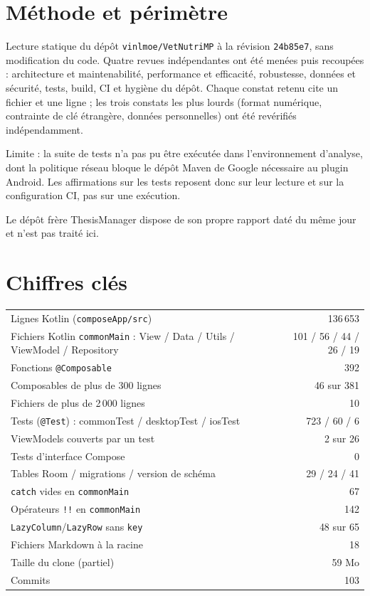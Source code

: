 \documentclass[11pt,a4paper]{article}
\newcommand{\fichier}[1]{\texttt{\small #1}}
\newcommand{\code}[1]{\texttt{#1}}
\begin{document}
\section{Méthode et périmètre}

Lecture statique du dépôt \code{vinlmoe/VetNutriMP} à la révision \code{24b85e7}, sans
modification du code. Quatre revues indépendantes ont été menées puis recoupées : architecture et
maintenabilité, performance et efficacité, robustesse, données et sécurité, tests, build, CI et
hygiène du dépôt. Chaque constat retenu cite un fichier et une ligne ; les trois constats les plus
lourds (format numérique, contrainte de clé étrangère, données personnelles) ont été revérifiés
indépendamment.

Limite : la suite de tests n'a pas pu être exécutée dans l'environnement d'analyse, dont la
politique réseau bloque le dépôt Maven de Google nécessaire au plugin Android. Les affirmations
sur les tests reposent donc sur leur lecture et sur la configuration CI, pas sur une exécution.

Le dépôt frère ThesisManager dispose de son propre rapport daté du même jour et n'est pas traité
ici.

\section{Chiffres clés}

\begin{center}
\begin{tabular}{lr}
\toprule
Lignes Kotlin (\fichier{composeApp/src}) & 136\,653 \\
Fichiers Kotlin \code{commonMain} : View / Data / Utils / ViewModel / Repository & 101 / 56 / 44 / 26 / 19 \\
Fonctions \code{@Composable} & 392 \\
Composables de plus de 300 lignes & 46 sur 381 \\
Fichiers de plus de 2\,000 lignes & 10 \\
Tests (\code{@Test}) : commonTest / desktopTest / iosTest & 723 / 60 / 6 \\
ViewModels couverts par un test & 2 sur 26 \\
Tests d'interface Compose & 0 \\
Tables Room / migrations / version de schéma & 29 / 24 / 41 \\
\code{catch} vides en \code{commonMain} & 67 \\
Opérateurs \code{!!} en \code{commonMain} & 142 \\
\code{LazyColumn}/\code{LazyRow} sans \code{key} & 48 sur 65 \\
Fichiers Markdown à la racine & 18 \\
Taille du clone (partiel) & 59 Mo \\
Commits & 103 \\
\bottomrule
\end{tabular}
\end{center}
\end{document}
